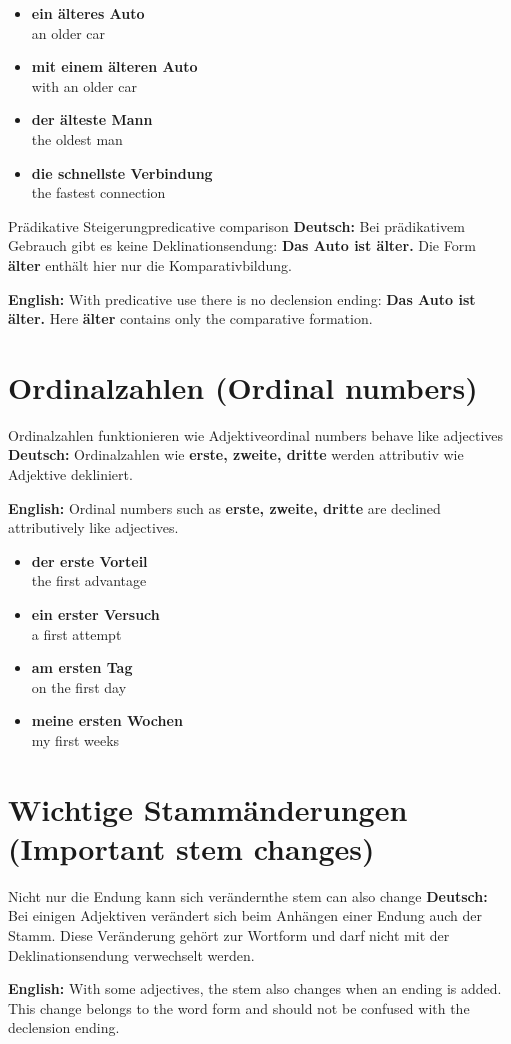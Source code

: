\documentclass[a4paper,11pt]{article}
\newcommand{\GermanText}[1]{\textbf{Deutsch: }#1\par}
\newcommand{\EnglishText}[1]{{\small\color{SoftGray}\textbf{English: }#1\par}}
\newcommand{\ExampleItem}[2]{\item \textbf{#1}\\{\small\color{SoftGray}#2}}
\begin{document}
\begin{exbox}
\begin{itemize}
\ExampleItem{ein älteres Auto}{an older car}
\ExampleItem{mit einem älteren Auto}{with an older car}
\ExampleItem{der älteste Mann}{the oldest man}
\ExampleItem{die schnellste Verbindung}{the fastest connection}
\end{itemize}
\end{exbox}

\begin{grammarentry}{Prädikative Steigerung}{predicative comparison}
\GermanText{Bei prädikativem Gebrauch gibt es keine Deklinationsendung: \textbf{Das Auto ist älter.} Die Form \textbf{älter} enthält hier nur die Komparativbildung.}
\EnglishText{With predicative use there is no declension ending: \textbf{Das Auto ist älter.} Here \textbf{älter} contains only the comparative formation.}
\end{grammarentry}

\section{Ordinalzahlen \textnormal{(Ordinal numbers)}}

\begin{grammarentry}{Ordinalzahlen funktionieren wie Adjektive}{ordinal numbers behave like adjectives}
\GermanText{Ordinalzahlen wie \textbf{erste, zweite, dritte} werden attributiv wie Adjektive dekliniert.}
\EnglishText{Ordinal numbers such as \textbf{erste, zweite, dritte} are declined attributively like adjectives.}
\end{grammarentry}

\begin{exbox}
\begin{itemize}
\ExampleItem{der erste Vorteil}{the first advantage}
\ExampleItem{ein erster Versuch}{a first attempt}
\ExampleItem{am ersten Tag}{on the first day}
\ExampleItem{meine ersten Wochen}{my first weeks}
\end{itemize}
\end{exbox}

\section{Wichtige Stammänderungen \textnormal{(Important stem changes)}}

\begin{grammarentry}{Nicht nur die Endung kann sich verändern}{the stem can also change}
\GermanText{Bei einigen Adjektiven verändert sich beim Anhängen einer Endung auch der Stamm. Diese Veränderung gehört zur Wortform und darf nicht mit der Deklinationsendung verwechselt werden.}
\EnglishText{With some adjectives, the stem also changes when an ending is added. This change belongs to the word form and should not be confused with the declension ending.}
\end{grammarentry}
\end{document}
